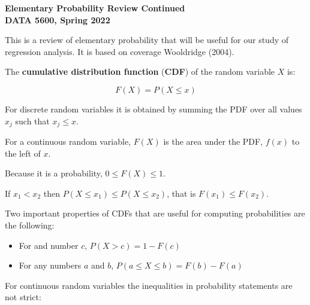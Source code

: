 \documentclass[11pt]{article}
\begin{document}
\pagestyle{empty}

\textbf{Elementary Probability Review Continued} \\
\textbf{DATA 5600, Spring 2022} \\
\vspace{3.5mm}


This is a review of elementary probability that will be useful for our study of regression analysis. It is based on coverage Wooldridge (2004).

\vspace{3.5mm}

The \textbf{cumulative distribution function} (\textbf{CDF}) of the random variable $X$ is:

\begin{equation*}
F(X) = P(X \leq x)
\end{equation*}

\vspace{2mm}

For discrete random variables it is obtained by summing the PDF over all values $x_{j}$ such that $x_{j} \leq x$.

\vspace{2mm}

For a continuous random variable, $F(X)$ is the area under the PDF, $f(x)$ to the left of $x$.

\vspace{2mm}

Because it is a probability, $0 \leq F(X) \leq 1$.

\vspace{2mm}

If $x_{1} < x_{2}$ then $P(X \leq x_{1}) \leq P(X \leq x_{2})$, that is $F(x_{1}) \leq F(x_{2})$.

\vspace{2mm}

Two important properties of CDFs that are useful for computing probabilities are the following:

\begin{itemize}
 \item For and number $c$, $P(X > c) = 1 - F(c)$
 \item For any numbers $a$ and $b$, $P(a \leq X \leq b) = F(b) - F(a)$
\end{itemize}

\vspace{2mm}

For continuous random variables the inequalities in probability statements are not strict:
\end{document}
